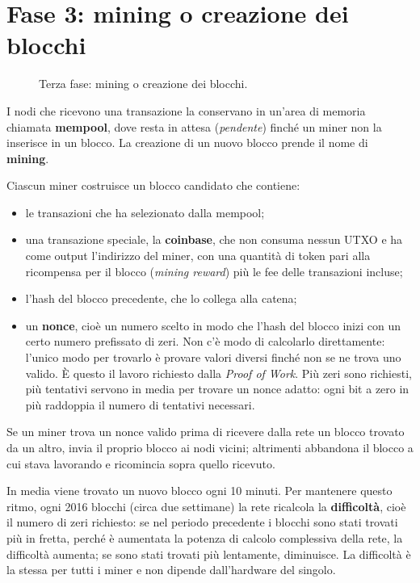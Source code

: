 \documentclass[a4paper, 11pt, oneside]{book}
\begin{document}
	\section{Fase 3: mining o creazione dei blocchi}\label{sec:fase3-mining}
	\begin{figure}[H]
		\centering
		\caption{Terza fase: mining o creazione dei blocchi.}
		\label{fig:ciclo-vita-fase3}
	\end{figure}

	I nodi che ricevono una transazione la conservano in un'area di memoria chiamata
	\textbf{mempool}, dove resta in attesa (\textit{pendente}) finché un miner non la
	inserisce in un blocco. La creazione di un nuovo blocco prende il nome di
	\textbf{mining}.

	Ciascun miner costruisce un blocco candidato che contiene:
	\begin{itemize}
		\item le transazioni che ha selezionato dalla mempool;
		\item una transazione speciale, la \textbf{coinbase}, che non consuma nessun UTXO
			e ha come output l'indirizzo del miner, con una quantità di token pari alla
			ricompensa per il blocco (\textit{mining reward}) più le fee delle transazioni
			incluse;
		\item l'hash del blocco precedente, che lo collega alla catena;
		\item un \textbf{nonce}, cioè un numero scelto in modo che l'hash del blocco inizi
			con un certo numero prefissato di zeri. Non c'è modo di calcolarlo
			direttamente: l'unico modo per trovarlo è provare valori diversi finché non se
			ne trova uno valido. È questo il lavoro richiesto dalla \textit{Proof of Work}.
			Più zeri sono richiesti, più tentativi servono in media per trovare un nonce
			adatto: ogni bit a zero in più raddoppia il numero di tentativi necessari.
	\end{itemize}
	Se un miner trova un nonce valido prima di ricevere dalla rete un blocco trovato da
	un altro, invia il proprio blocco ai nodi vicini; altrimenti abbandona il blocco a
	cui stava lavorando e ricomincia sopra quello ricevuto.

	In media viene trovato un nuovo blocco ogni 10 minuti. Per mantenere questo ritmo,
	ogni 2016 blocchi (circa due settimane) la rete ricalcola la \textbf{difficoltà},
	cioè il numero di zeri richiesto: se nel periodo precedente i blocchi sono stati
	trovati più in fretta, perché è aumentata la potenza di calcolo complessiva della
	rete, la difficoltà aumenta; se sono stati trovati più lentamente, diminuisce. La
	difficoltà è la stessa per tutti i miner e non dipende dall'hardware del singolo.
\end{document}
